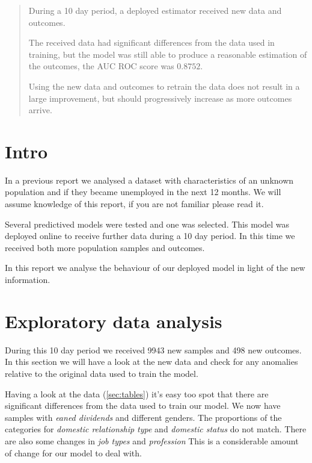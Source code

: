 \documentclass[a4paper]{article}
\begin{document}
    \maketitle

    \begin{abstract}
        During a 10 day period, a deployed estimator received new data and
        outcomes.

        The received data had significant differences from the data used in
        training, but the model was still able to produce a reasonable
        estimation of the outcomes, the AUC ROC score was \(0.8752\).

        Using the new data and outcomes to retrain the data does not result
        in  a large improvement, but should progressively increase
        as more outcomes arrive.
    \end{abstract}


    \section{Intro}
    \label{sec:intro}
    In a previous report we analysed a dataset with characteristics of an
    unknown population and if they became unemployed in the next 12 months.
    We will assume knowledge of this report, if you are not familiar please
    read it.

    Several predictived models were tested and one was selected.
    This model was deployed online to receive further data during a 10 day
    period.
    In this time we received both more population samples and outcomes.

    In this report we analyse the behaviour of our deployed model in light
    of the new information.


    \section{Exploratory data analysis}
    \label{sec:data}

    During this 10 day period we received 9943 new samples and 498 new
    outcomes.
    In this section we will have a look at the new data and check for any
    anomalies relative to the original data used to train the model.

    Having a look at the data (\vref{sec:tables}) it's easy too spot that
    there are significant differences from the data used to train our model.
    We now have samples with \emph{eaned dividends} and different genders.
    The proportions of the categories for \emph{domestic relationship type}
    and \emph{domestic status} do not match.
    There are also some changes in \emph{job types} and \emph{profession}
    This is a considerable amount of change for our model to deal with.
\end{document}

